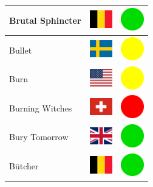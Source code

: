\documentclass[12pt, a4paper, twoside]{report}
\begin{document}
\begin{center}
\begin{longtable}{|p{5cm}|p{2cm}|p{2cm}|}
 Brutal Sphincter                                           & \includegraphics[width=1cm]{../img/flags/be} &   \includegraphics[width=1cm]{../likes/y} \\ \hline
 Bullet                                                     & \includegraphics[width=1cm]{../img/flags/se} &   \includegraphics[width=1cm]{../likes/m} \\ \hline
 Burn                                                       & \includegraphics[width=1cm]{../img/flags/us} &   \includegraphics[width=1cm]{../likes/m} \\ \hline
 Burning Witches                                            & \includegraphics[width=1cm]{../img/flags/ch} &   \includegraphics[width=1cm]{../likes/n} \\ \hline
 Bury Tomorrow                                              & \includegraphics[width=1cm]{../img/flags/gb} &   \includegraphics[width=1cm]{../likes/y} \\ \hline
 Bütcher                                                    & \includegraphics[width=1cm]{../img/flags/be} &   \includegraphics[width=1cm]{../likes/y} \\ \hline

\end{longtable}
\end{center}
\end{document}
